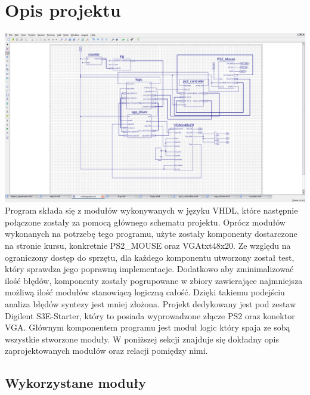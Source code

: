 \documentclass[polish,polish,a4paper]{article}
\begin{document}
\section{Opis projektu}
\includegraphics[width=16cm]{top.png}
\break
Program składa się z modułów wykonywanych w języku VHDL, które następnie połączone zostały za pomocą głównego schematu projektu.
Oprócz modułów wykonanych na potrzebę tego programu, użyte zostały komponenty dostarczone na stronie kursu, konkretnie PS2\_MOUSE oraz VGAtxt48x20.
Ze względu na ograniczony dostęp do sprzętu, dla każdego komponentu utworzony został test, który sprawdza jego poprawną implementacje.
Dodatkowo aby zminimalizować ilość błędów, komponenty zostały pogrupowane w zbiory zawierające najmniejsza możliwą ilość modułów stanowiącą logiczną całość.
Dzięki takiemu podejściu analiza błędów syntezy jest mniej złożona.
Projekt dedykowany jest pod zestaw Digilent S3E-Starter, który to posiada wyprowadzone złącze PS2 oraz konektor VGA.
\newline
Głównym komponentem programu jest moduł logic który spaja ze sobą wszystkie stworzone moduły.
W poniższej sekcji znajduje się dokładny opis zaprojektowanych modułów oraz relacji pomiędzy nimi. 
\newpage
\subsection{Wykorzystane moduły}
\end{document}
